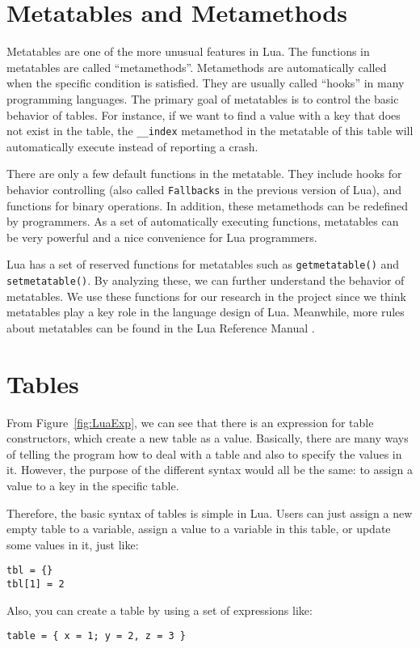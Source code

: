 \section{Metatables and Metamethods}
Metatables are one of the more unusual features in Lua. The functions in metatables are called ``metamethods''. Metamethods are automatically called when the specific condition is satisfied. They are usually called ``hooks'' in many programming languages. The primary goal of metatables is to control the basic behavior of tables. For instance, if we want to find a value with a key that does not exist in the table, the {\tt \_\_index} metamethod in the metatable of this table will automatically execute instead of reporting a crash.

There are only a few default functions in the metatable. They include hooks for behavior controlling (also called {\tt Fallbacks} in the previous version of Lua), and functions for binary operations. In addition, these metamethods can be redefined by programmers. As a set of automatically executing functions, metatables can be very powerful and a nice convenience for Lua programmers.

Lua has a set of reserved functions for metatables such as {\tt getmetatable()} and {\tt setmetatable()}. By analyzing these, we can further understand the behavior of metatables. We use these functions for our research in the project since we think metatables play a key role in the language design of Lua. Meanwhile, more rules about metatables can be found in the Lua Reference Manual \cite{LRM}.

\section{Tables}\label{sec: LuaTable}
From Figure~\ref{fig:LuaExp}, we can see that there is an expression for table constructors, which create a new table as a value. Basically, there are many ways of telling the program how to deal with a table and also to specify the values in it. However, the purpose of the different syntax would all be the same: to assign a value to a key in the specific table.

Therefore, the basic syntax of tables is simple in Lua. Users can just assign a new empty table to a variable, assign a value to a variable in this table, or update some values in it, just like:

\begin{verbatim}
tbl = {}
tbl[1] = 2 
\end{verbatim}
Also, you can create a table by using a set of expressions like:
\begin{verbatim}
table = { x = 1; y = 2, z = 3 } 
\end{verbatim}

